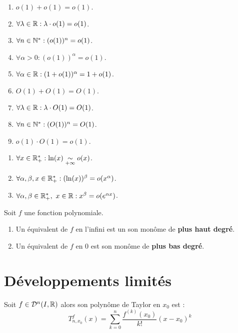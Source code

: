 \begin{proposition}
	\begin{enumerate}
        \item $o(1) + o(1) = o(1)$.
        \item $\forall \lambda \in \mathbb{R} : \lambda \cdot o(1) = o(1)$.
        \item $\forall n \in \mathbb{N}^* : (o(1))^n = o(1)$.
        \item $\forall \alpha > 0 : (o(1))^{\alpha} = o(1)$.
        \item $\forall \alpha \in \mathbb{R} : (1 + o(1))^{\alpha} = 1 + o(1)$.
        \item $O(1) + O(1) = O(1)$.
        \item $\forall \lambda \in \mathbb{R} : \lambda \cdot O(1) = O(1)$.
        \item $\forall n \in \mathbb{N}^* : (O(1))^n = O(1)$.
        \item $o(1) \cdot O(1) = o(1)$.
    \end{enumerate}
\end{proposition}

\begin{proposition}
	\begin{enumerate}
        \item $\forall x \in \mathbb{R}_+^* : \ln(x) \underset{+\infty}{\sim} o(x)$.
        \item $\forall \alpha, \beta, x \in \mathbb{R}_+^* : (\ln(x))^{\beta} = o(x^{\alpha})$.
        \item $\forall \alpha, \beta \in \mathbb{R}_+^*,\ x \in \mathbb{R} : x^{\beta} = o(e^{\alpha x})$.
    \end{enumerate}
\end{proposition}

\begin{proposition}
    Soit $f$ une fonction polynomiale. 
    \begin{enumerate}
        \item Un équivalent de $f$ en l'infini est un son monôme de \textbf{plus haut degré}.
        \item Un équivalent de $f$ en 0 est son monôme de \textbf{plus bas degré}.
    \end{enumerate}
\end{proposition}

\section{Développements limités}

\begin{definition}
    Soit $f \in \mathcal{D}^n(I, \mathbb{R})$ alors son polynôme de Taylor en $x_0$ est :
    \[ T_{n, x_0}^f(x) = \sum_{k = 0}^{n} \frac{f^{(k)}(x_0)}{k!} (x - x_0)^k \]
\end{definition}

